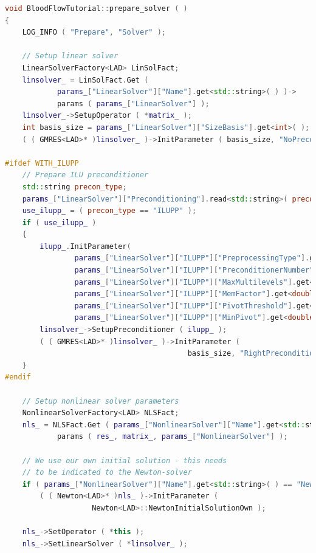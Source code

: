 \documentclass[a4paper, 11pt, twoside]{article}
\begin{document}
\begin{lstlisting}[language=C++, basicstyle={\footnotesize, \ttfamily}, keywordstyle=\color{blue},  numbers=none, tabsize=4]
void BloodFlowTutorial::prepare_solver ( )
{
    LOG_INFO ( "Prepare", "Solver" );

    // Setup linear solver
    LinearSolverFactory<LAD> LinSolFact;
    linsolver_ = LinSolFact.Get (
            params_["LinearSolver"]["Name"].get<std::string>( ) )->
            params ( params_["LinearSolver"] );
    linsolver_->SetupOperator ( *matrix_ );
    int basis_size = params_["LinearSolver"]["SizeBasis"].get<int>( );
    ( ( GMRES<LAD>* )linsolver_ )->InitParameter ( basis_size, "NoPreconditioning" );

#ifdef WITH_ILUPP
    // Prepare ILU preconditioner
    std::string precon_type;
    params_["LinearSolver"]["Preconditioning"].read<std::string>( precon_type );
    use_ilupp_ = ( precon_type == "ILUPP" );
    if ( use_ilupp_ )
    {
        ilupp_.InitParameter(
                params_["LinearSolver"]["ILUPP"]["PreprocessingType"].get<int>( ),
                params_["LinearSolver"]["ILUPP"]["PreconditionerNumber"].get<int>( ),
                params_["LinearSolver"]["ILUPP"]["MaxMultilevels"].get<int>( ),
                params_["LinearSolver"]["ILUPP"]["MemFactor"].get<double>( ),
                params_["LinearSolver"]["ILUPP"]["PivotThreshold"].get<double>( ),
                params_["LinearSolver"]["ILUPP"]["MinPivot"].get<double>( ) );
        linsolver_->SetupPreconditioner ( ilupp_ );
        ( ( GMRES<LAD>* )linsolver_ )->InitParameter ( 
                                          basis_size, "RightPreconditioning" );
    }
#endif

    // Setup nonlinear solver parameters
    NonlinearSolverFactory<LAD> NLSFact;
    nls_ = NLSFact.Get ( params_["NonlinearSolver"]["Name"].get<std::string>( ) )->
            params ( res_, matrix_, params_["NonlinearSolver"] );

    // We use our own initial solution - this needs 
    // to be indicated to the Newton-solver
    if ( params_["NonlinearSolver"]["Name"].get<std::string>( ) == "Newton" )
        ( ( Newton<LAD>* )nls_ )->InitParameter ( 
        			Newton<LAD>::NewtonInitialSolutionOwn );

    nls_->SetOperator ( *this );
    nls_->SetLinearSolver ( *linsolver_ );


\end{lstlisting}
\end{document}
